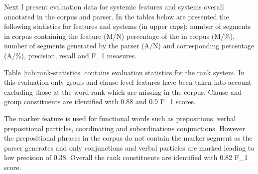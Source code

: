 
Next I present evaluation data for systemic features and systems overall annotated in the corpus and parser. In the tables below are presented the following statistics for features and systems (in upper caps): number of segments in corpus containing the feature (M/N) percentage of the in corpus (M/\%), number of segments generated by the parser (A/N) and corresponding percentage (A/\%), precision, recall and F_{1} measures. 

Table \ref{tab:rank-statistics} contains evaluation statistics for the rank system. In this evaluation only group and clause level features have been taken into account excluding those at the word rank which are missing in the corpus. Clause and group constituents are identified with 0.88 and 0.9 F_{1} scores. 

The marker feature is used for functional words such as prepositions, verbal prepositional particles, coordinating and subordinations conjunctions. However the prepositional phrases in the corpus do not contain the marker segment as the parser generates and only conjunctions and verbal particles are marked leading to low precision of 0.38. Overall the rank constituents are identified with 0.82 F_{1} score.

